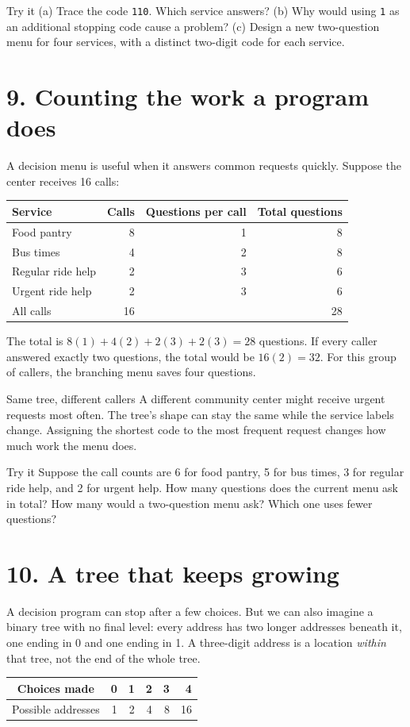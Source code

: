\documentclass[10pt]{article}
\newcommand{\sect}[1]{\medskip\section*{\color{olive}#1}\vspace{-5pt}}
\begin{document}
\begin{taskbox}{Try it}
(a) Trace the code \texttt{110}. Which service answers? (b) Why would using \texttt{1} as an additional stopping code cause a problem? (c) Design a new two-question menu for four services, with a distinct two-digit code for each service.
\end{taskbox}
\sect{9. Counting the work a program does}
A decision menu is useful when it answers common requests quickly. Suppose the center receives 16 calls:
\begin{center}\begin{tabular}{lrrr}\toprule Service & Calls & Questions per call & Total questions\\\midrule Food pantry & 8 & 1 & 8\\Bus times & 4 & 2 & 8\\Regular ride help & 2 & 3 & 6\\Urgent ride help & 2 & 3 & 6\\\midrule All calls & 16 && 28\\\bottomrule\end{tabular}\end{center}
The total is $8(1)+4(2)+2(3)+2(3)=28$ questions. If every caller answered exactly two questions, the total would be $16(2)=32$. For this group of callers, the branching menu saves four questions.
\begin{worked}{Same tree, different callers}
A different community center might receive urgent requests most often. The tree's shape can stay the same while the service labels change. Assigning the shortest code to the most frequent request changes how much work the menu does.
\end{worked}
\begin{taskbox}{Try it}
Suppose the call counts are 6 for food pantry, 5 for bus times, 3 for regular ride help, and 2 for urgent help. How many questions does the current menu ask in total? How many would a two-question menu ask? Which one uses fewer questions?
\end{taskbox}
\sect{10. A tree that keeps growing}
A decision program can stop after a few choices. But we can also imagine a binary tree with no final level: every address has two longer addresses beneath it, one ending in 0 and one ending in 1. A three-digit address is a location \emph{within} that tree, not the end of the whole tree.
\begin{center}\begin{tabular}{c|rrrrr}\toprule Choices made & 0 & 1 & 2 & 3 & 4\\\midrule Possible addresses & 1 & 2 & 4 & 8 & 16\\\bottomrule\end{tabular}\end{center}
\end{document}

